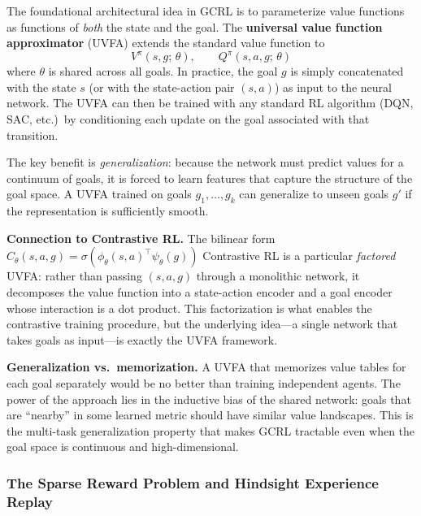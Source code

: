 \documentclass[11pt, letterpaper]{article}
\begin{document}
\begin{concept}
    The foundational architectural idea in GCRL is to parameterize value functions as functions of \textit{both} the state and the goal. The \textbf{universal value function approximator} (UVFA) extends the standard value function to
    \[
        V^\pi(s, g;\, \theta), \qquad Q^\pi(s, a, g;\, \theta)
    \]
    where \(\theta\) is shared across all goals. In practice, the goal \(g\) is simply concatenated with the state \(s\) (or with the state-action pair \((s, a)\)) as input to the neural network. The UVFA can then be trained with any standard RL algorithm (DQN, SAC, etc.)\ by conditioning each update on the goal associated with that transition.
 
    The key benefit is \textit{generalization}: because the network must predict values for a continuum of goals, it is forced to learn features that capture the structure of the goal space. A UVFA trained on goals \(g_1, \dots, g_k\) can generalize to unseen goals \(g'\) if the representation is sufficiently smooth.
\end{concept}
 
\begin{remark}
    \textbf{Connection to Contrastive RL.} The bilinear form \(\hat{C}_\theta(s, a, g) = \sigma(\phi_\theta(s,a)^\top \psi_\theta(g))\) Contrastive RL is a particular \textit{factored} UVFA: rather than passing \((s, a, g)\) through a monolithic network, it decomposes the value function into a state-action encoder and a goal encoder whose interaction is a dot product. This factorization is what enables the contrastive training procedure, but the underlying idea---a single network that takes goals as input---is exactly the UVFA framework.
 
    \textbf{Generalization vs.\ memorization.} A UVFA that memorizes value tables for each goal separately would be no better than training independent agents. The power of the approach lies in the inductive bias of the shared network: goals that are ``nearby'' in some learned metric should have similar value landscapes. This is the multi-task generalization property that makes GCRL tractable even when the goal space is continuous and high-dimensional.
\end{remark}
 
\subsubsection{The Sparse Reward Problem and Hindsight Experience Replay}
 
\end{document}
